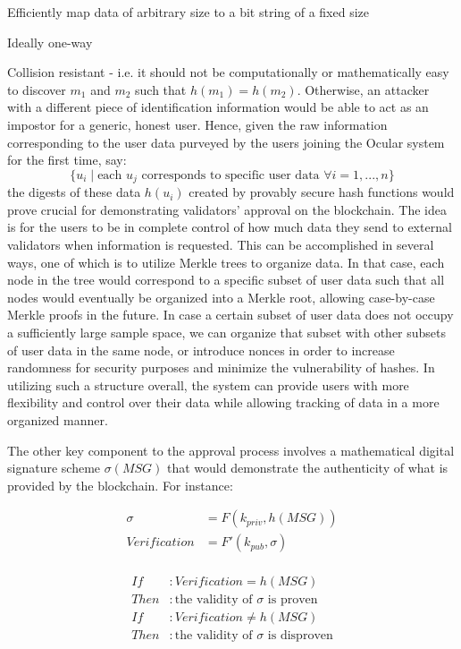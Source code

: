 \documentclass[12pt]{article}
\let\tempone\itemize
\let\temptwo\enditemize
\renewenvironment{itemize}{\tempone\addtolength{\itemsep}{-5pt}}{\temptwo}
\begin{document}
\begin{itemize}
\item Efficiently map data of arbitrary size to a bit string of a fixed size
\item Ideally one-way
\item Collision resistant - i.e. it should not be computationally or mathematically easy to discover $m_1$ and $m_2$ such that $h(m_1)=h(m_2)$. Otherwise, an attacker with a different piece of identification information would be able to act as an impostor for a generic, honest user.
\end{itemize} Hence, given the raw information corresponding to the user data purveyed by the users joining the Ocular system for the first time, say: $$\{u_i\mid\text{each }u_j\text{ corresponds to specific user data }\forall i=1,...,n\}$$ the digests of these data $h(u_i)$ created by provably secure hash functions would prove crucial for demonstrating validators' approval on the blockchain.
The idea is for the users to be in complete control of how much data they send to external validators when information is requested. This can be accomplished in several ways, one of which is to utilize Merkle trees to organize data. In that case, each node in the tree would correspond to a specific subset of user data such that all nodes would eventually be organized into a Merkle root, allowing case-by-case Merkle proofs in the future. In case a certain subset of user data does not occupy a sufficiently large sample space, we can organize that subset with other subsets of user data in the same node, or introduce nonces in order to increase randomness for security purposes and minimize the vulnerability of hashes. In utilizing such a structure overall, the system can provide users with more flexibility and control over their data while allowing tracking of data in a more organized manner.

The other key component to the approval process involves a mathematical digital signature scheme $\sigma(MSG)$ that would demonstrate the authenticity of what is provided by the blockchain. For instance:

\begin{align*}
\sigma &= F(k_{priv}, h(MSG))\\
Verification &= F'(k_{pub}, \sigma)
\end{align*}\\
\begin{align*}
If&: Verification=h(MSG)\\
Then&: \text{the validity of $\sigma$ is proven}\\
If&: Verification\neq h(MSG)\\
Then&: \text{the validity of $\sigma$ is disproven}
\end{align*}
\end{document}
